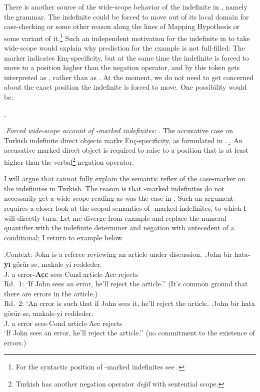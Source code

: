 \documentclass[11pt,a4paper]{article}
\newcommand{\encspec}{Enç-specific}
\begin{document}
There is another source of the wide-scope behavior of the indefinite
in , namely the grammar. The indefinite could be
forced to move out of its local domain for case-checking or some other
reason along the lines of  Mapping Hypothesis or some
variant of it.\footnote{For the syntactic position of \acc-marked
indefinites see .} Such an
independent motivation for the indefinite in  to
take wide-scope would explain why  prediction for the
example is not full-filled: The marker indicates \encspec ity, but at
the same time the indefinite is forced to move to a position higher
than the negation operator, and by this token  gets
interpreted as , rather than as .
At the moment, we do not need to get concerned about the exact
position the indefinite is forced to move. One possibility would be:

\ex.

\ex.\label{wscopeaccount}{\it Forced wide-scope account of \acc-marked indefinites:}
\a. The accusative case on Turkish indefinite direct objects marks \encspec ity, as formulated in . 
\b. An accusative marked direct object is required to raise to a position that is at least higher than the verbal\footnote{Turkish has another negation operator \textit{değil} with sentential scope.} negation operator.


I will argue that  cannot fully explain the semantic reflex
of the case-marker on the indefinites in Turkish. The reason is that
\acc-marked indefinites do not necessarily get a wide-scope reading as was the
case in . Such an argument requires a closer look at the
scopal semantics of \acc-marked indefinites, to which I will directly turn. Let
me diverge from  example and  replace the numeral quantifier
 with the indefinite determiner  and
negation with antecedent of a conditional; I return to  example
below.

\ex.Context: John is a referee reviewing an article under discussion.
\ag.\label{conda}John bir hata{\bf-yı} görür-se, makale-yi reddeder.\\
	J. a error{\bf-Acc} sees-Cond article-Acc rejects\\
	Rd.\ 1: `If John sees an error, he'll reject the article.'' (It's common
	ground that there are errors in the article.)\\
	Rd.\ 2: `An error is such that if John sees it, he'll reject the article.
\bg.\label{condz}John bir hata görür-se, makale-yi reddeder.\\
	J. a error sees-Cond article-Acc rejects\\
	`If John sees an error, he'll reject the article.'' (no commitment to the existence of errors.)
\end{document}
